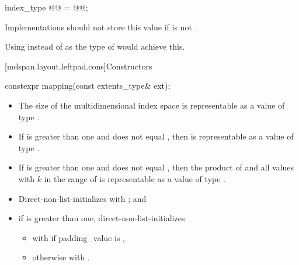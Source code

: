 \begin{itemdecl}
index_type @@ = @@;
\end{itemdecl}

\begin{itemdescr}
\pnum
\recommended
Implementations should not store this value
if  is not .
\begin{note}
Using  instead of
 as the type of  would achieve this.
\end{note}
\end{itemdescr}

[mdspan.layout.leftpad.cons]{Constructors}

%
\begin{itemdecl}
constexpr mapping(const extents_type& ext);
\end{itemdecl}

\begin{itemdescr}
\pnum
\expects
\begin{itemize}
\item
The size of the multidimensional index space  is representable as
a value of type .
\item
If  is greater than one and
 does not equal ,
then 
is representable as a value of type .
\item
If  is greater than one and
 does not equal ,
then the product of
 and
all values 
with $k$ in the range of 
is representable as a value of type .
\end{itemize}

\pnum
\effects
\begin{itemize}
\item
Direct-non-list-initializes  with ; and
\item
if  is greater than one,
direct-non-list-initializes 
\begin{itemize}
\item
with  if padding_value is ,
\item
otherwise with
.
\end{itemize}
\end{itemize}
\end{itemdescr}

